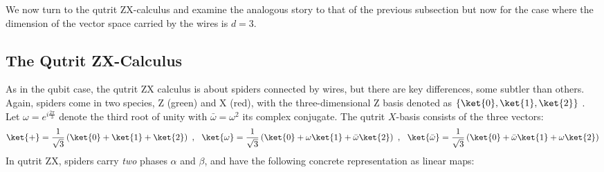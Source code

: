 \documentclass[submission,copyright,creativecommons]{eptcs}
\begin{document}
We now turn to the qutrit ZX-calculus and examine the analogous story to that of the previous subsection
but now for the case where the dimension of the vector space carried by the wires is $d=3$.


\subsection{The Qutrit ZX-Calculus}


As in the qubit case, the qutrit ZX calculus is about spiders connected by wires, but there are key differences, some subtler than others.
Again, spiders come in two species, Z (green) and X (red),
with the three-dimensional Z basis denoted as $\{\ket{0},\ket{1},\ket{2}\}$ .
Let $\omega = e^{i \frac{2\pi}{3}}$ denote the third root of unity
with $\bar\omega = \omega^2$ its complex conjugate.
The qutrit $X$-basis consists of the three vectors: 
\begin{equation}
	\ket{+} = \frac{1}{\sqrt{3}} \left(\ket{0} + \ket{1} + \ket{2}\right)~,~~
	\ket{\omega} = \frac{1}{\sqrt{3}} \left(\ket{0} + \omega\ket{1} + \bar{\omega}\ket{2}\right)~,~~
	\ket{\bar{\omega}} = \frac{1}{\sqrt{3}} \left(\ket{0} + \bar{\omega}\ket{1} + \omega\ket{2}\right)
\end{equation}
In qutrit ZX,
spiders carry \textit{two} phases $\alpha$ and $\beta$,
and have the following concrete representation as linear maps:
\begingroup
	\allowdisplaybreaks
	\setlength{\jot}{10pt}
\end{document}
